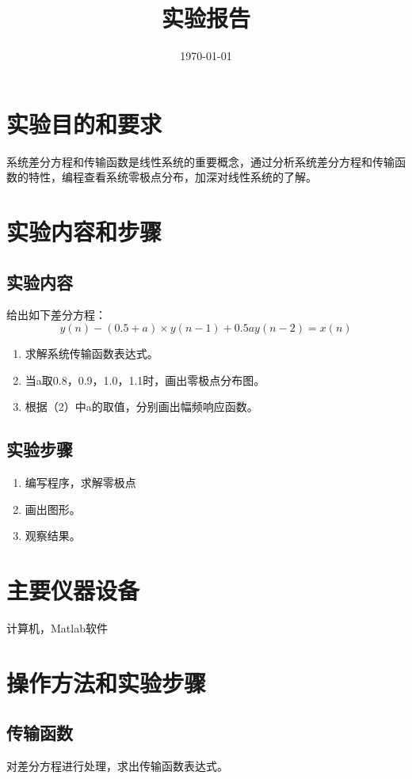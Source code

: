 \documentclass{hitreport}
\title{实验报告}
\date{\today}
\begin{document}
\makecover
\makeheader


\section{实验目的和要求}
系统差分方程和传输函数是线性系统的重要概念，通过分析系统差分方程和传输函数的特性，编程查看系统零极点分布，加深对线性系统的了解。
\section{实验内容和步骤}

\subsection{实验内容}

给出如下差分方程：
$$y(n) - (0.5+a)\times y(n-1) + 0.5ay(n-2) = x(n)$$
\begin{enumerate}
  \item 求解系统传输函数表达式。
  \item 当a取0.8，0.9，1.0，1.1时，画出零极点分布图。
  \item 根据（2）中a的取值，分别画出幅频响应函数。
\end{enumerate}

\subsection{实验步骤}
\begin{enumerate}
  \item 编写程序，求解零极点
  \item 画出图形。
  \item 观察结果。
\end{enumerate}

\section{主要仪器设备}
计算机，Matlab软件

\section{操作方法和实验步骤}
\subsection{传输函数}
对差分方程进行处理，求出传输函数表达式。
\end{document}
